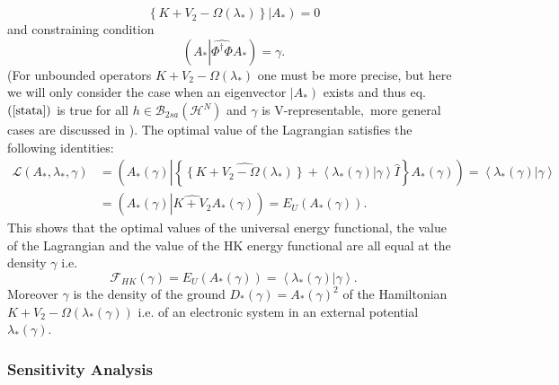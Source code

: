 \documentclass[aps,preprint]{revtex4}%
\begin{document}
\begin{equation}
\widehat{\left\{  K+V_{2}-\Omega\left(  \lambda_{\ast}\right)  \right\}
}\left\vert A_{\ast}\right)  =0 \label{Stateig}%
\end{equation}
and constraining condition
\begin{equation}
\left(  A_{\ast}\left\vert \widehat{\Phi^{\dagger}\Phi}\right.  A_{\ast
}\right)  =\gamma.
\end{equation}
(For unbounded operators $K+V_{2}-\Omega\left(  \lambda_{\ast}\right)  $ one
must be more precise, but here we will only consider the case when an
eigenvector $\left\vert A_{\ast}\right)  $ exists and thus eq. $\left(
\ref{stata}\right)  $ is true for all $h\in\mathcal{B}_{2sa}\left(
\mathcal{H}^{N}\right)  $ and $\gamma$ is V-representable$,$ more general
cases are discussed in \cite{weiner2006}). The optimal value of the Lagrangian
satisfies the following identities:
\begin{align}
\mathcal{L}\left(  A_{\ast},\lambda_{\ast},\gamma\right)   &  =\left(
A_{\ast}\left(  \gamma\right)  \left\vert \left\{  \widehat{\left\{
K+V_{2}-\Omega\left(  \lambda_{\ast}\right)  \right\}  }+\left\langle \left.
\lambda_{\ast}\left(  \gamma\right)  \right\vert \gamma\right\rangle \hat
{I}\right\}  \right.  A_{\ast}\left(  \gamma\right)  \right)  =\left\langle
\left.  \lambda_{\ast}\left(  \gamma\right)  \right\vert \gamma\right\rangle
\nonumber\\
&  =\left(  A_{\ast}\left(  \gamma\right)  \left\vert \widehat{K+V_{2}%
}\right.  A_{\ast}\left(  \gamma\right)  \right)  =E_{U}\left(  A_{\ast
}\left(  \gamma\right)  \right)  .
\end{align}
This shows that the optimal values of the universal energy functional, the
value of the Lagrangian and the value of the HK energy functional are all
equal at the density $\gamma$ i.e.
\begin{equation}
\mathcal{F}_{HK}\left(  \gamma\right)  =E_{U}\left(  A_{\ast}\left(
\gamma\right)  \right)  =\left\langle \left.  \lambda_{\ast}\left(
\gamma\right)  \right\vert \gamma\right\rangle .
\end{equation}
Moreover $\gamma$ is the density of the ground $D_{\ast}\left(  \gamma\right)
=A_{\ast}\left(  \gamma\right)  ^{2}$ of the Hamiltonian $K+V_{2}%
-\Omega\left(  \lambda_{\ast}\left(  \gamma\right)  \right)  $ i.e. of an
electronic system in an external potential $\lambda_{\ast}\left(
\gamma\right)  $.

\subsubsection{Sensitivity Analysis}
\end{document}
